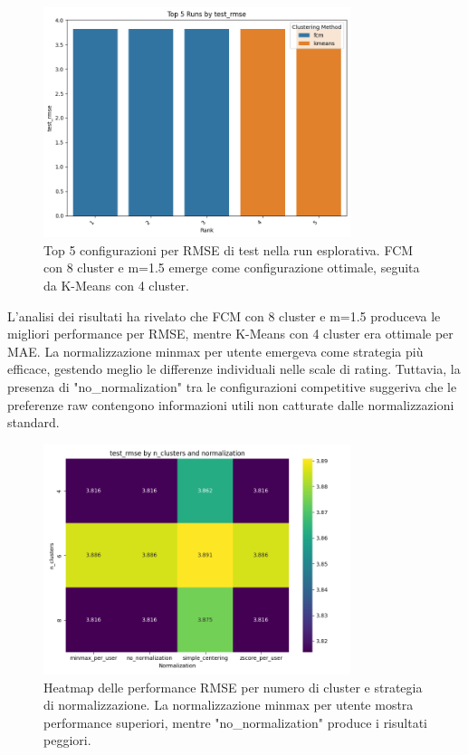 \begin{figure}[h]
\centering
\includegraphics[width=0.8\textwidth]{output/run_sample/images/comparison/test_rmse/barplot_top_5_test_rmse.png}
\caption{Top 5 configurazioni per RMSE di test nella run esplorativa. FCM con 8 cluster e m=1.5 emerge come configurazione ottimale, seguita da K-Means con 4 cluster.}
\label{fig:sample_rmse_top5}
\end{figure}

L'analisi dei risultati ha rivelato che FCM con 8 cluster e m=1.5 produceva le migliori performance per RMSE, mentre K-Means con 4 cluster era ottimale per MAE. La normalizzazione minmax per utente emergeva come strategia più efficace, gestendo meglio le differenze individuali nelle scale di rating. Tuttavia, la presenza di "no\_normalization" tra le configurazioni competitive suggeriva che le preferenze raw contengono informazioni utili non catturate dalle normalizzazioni standard.

\begin{figure}[h]
\centering
\includegraphics[width=0.8\textwidth]{output/run_sample/images/comparison/test_rmse/heatmap_test_rmse.png}
\caption{Heatmap delle performance RMSE per numero di cluster e strategia di normalizzazione. La normalizzazione minmax per utente mostra performance superiori, mentre "no\_normalization" produce i risultati peggiori.}
\label{fig:sample_rmse_heatmap}
\end{figure}

